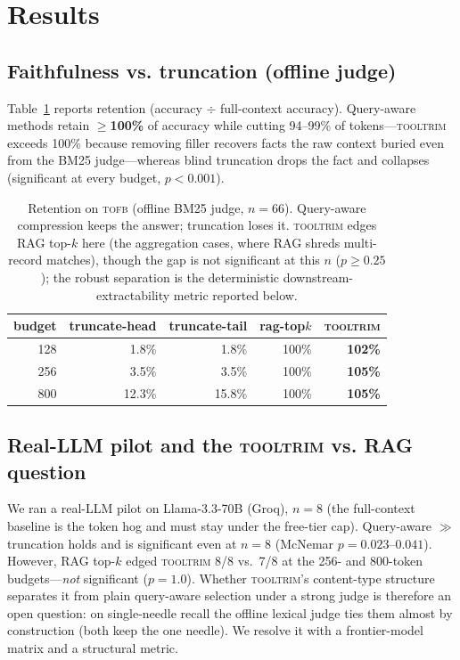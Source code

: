 \documentclass[11pt]{article}
\newcommand{\tooltrim}{\textsc{tooltrim}}
\newcommand{\tofb}{\textsc{tofb}}
\begin{document}
\section{Results}
\subsection{Faithfulness vs. truncation (offline judge)}
Table~\ref{tab:baselines} reports retention (accuracy $\div$ full-context
accuracy). Query-aware methods retain \textbf{$\geq$100\%} of accuracy while
cutting 94--99\% of tokens---\tooltrim{} exceeds 100\% because removing filler
recovers facts the raw context buried even from the BM25 judge---whereas blind
truncation drops the fact and collapses (significant at every budget,
$p<0.001$).

\begin{table}[t]
\centering
\begin{tabular}{rrrrr}
\toprule
budget & truncate-head & truncate-tail & rag-top$k$ & \textbf{\tooltrim} \\
\midrule
128 & 1.8\% & 1.8\% & 100\% & \textbf{102\%} \\
256 & 3.5\% & 3.5\% & 100\% & \textbf{105\%} \\
800 & 12.3\% & 15.8\% & 100\% & \textbf{105\%} \\
\bottomrule
\end{tabular}
\caption{Retention on \tofb{} (offline BM25 judge, $n{=}66$). Query-aware
compression keeps the answer; truncation loses it. \tooltrim{} edges RAG top-$k$
here (the aggregation cases, where RAG shreds multi-record matches), though the
gap is not significant at this $n$ ($p\geq 0.25$); the robust separation is the
deterministic downstream-extractability metric reported below.}
\label{tab:baselines}
\end{table}

\subsection{Real-LLM pilot and the \tooltrim{} vs. RAG question}
We ran a real-LLM pilot on Llama-3.3-70B (Groq), $n=8$ (the full-context baseline
is the token hog and must stay under the free-tier cap). Query-aware $\gg$
truncation holds and is significant even at $n=8$ (McNemar $p=0.023$--$0.041$).
However, RAG top-$k$ edged \tooltrim{} 8/8 vs.\ 7/8 at the 256- and 800-token
budgets---\emph{not} significant ($p=1.0$). Whether \tooltrim's content-type
structure separates it from plain query-aware selection under a strong judge is
therefore an open question: on single-needle recall the offline lexical judge ties
them almost by construction (both keep the one needle). We resolve it with a
frontier-model matrix and a structural metric.
\end{document}

